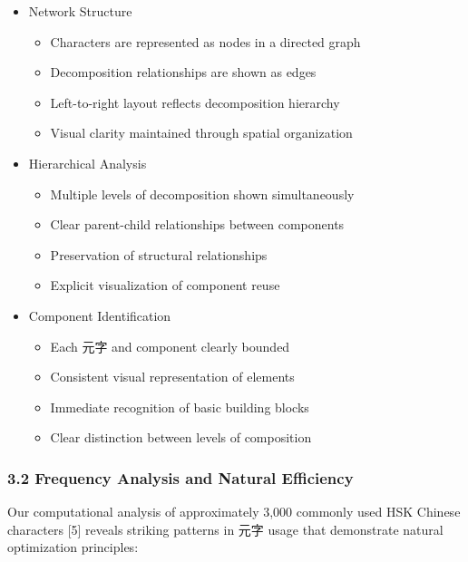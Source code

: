 \documentclass[
  11pt,
  letterpaper,
]{article}
\providecommand{\tightlist}{%
  \setlength{\itemsep}{0pt}\setlength{\parskip}{0pt}}
\begin{document}
\begin{itemize}
\tightlist
\item
  Network Structure

  \begin{itemize}
  \tightlist
  \item
    Characters are represented as nodes in a directed graph
  \item
    Decomposition relationships are shown as edges
  \item
    Left-to-right layout reflects decomposition hierarchy
  \item
    Visual clarity maintained through spatial organization
  \end{itemize}
\item
  Hierarchical Analysis

  \begin{itemize}
  \tightlist
  \item
    Multiple levels of decomposition shown simultaneously
  \item
    Clear parent-child relationships between components
  \item
    Preservation of structural relationships
  \item
    Explicit visualization of component reuse
  \end{itemize}
\item
  Component Identification

  \begin{itemize}
  \tightlist
  \item
    Each 元字 and component clearly bounded
  \item
    Consistent visual representation of elements
  \item
    Immediate recognition of basic building blocks
  \item
    Clear distinction between levels of composition
  \end{itemize}
\end{itemize}

\hypertarget{frequency-analysis-and-natural-efficiency}{%
\subsubsection{3.2 Frequency Analysis and Natural
Efficiency}\label{frequency-analysis-and-natural-efficiency}}

Our computational analysis of approximately 3,000 commonly used HSK
Chinese characters {[}5{]} reveals striking patterns in 元字 usage that
demonstrate natural optimization principles:
\end{document}
